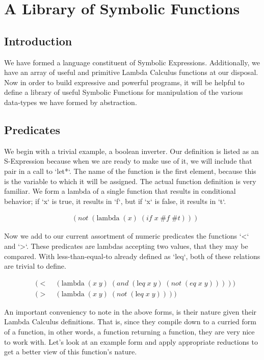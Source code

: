 
\chapter{A Library of Symbolic Functions}
\section{Introduction}
We have formed a language constituent of Symbolic Expressions. Additionally, we 
have an array of useful and primitive Lambda Calculus functions at our disposal. 
Now in order to build expressive and powerful programs, it will be helpful to 
define a library of useful Symbolic Functions for manipulation of the various 
data-types we have formed by abstraction.

\section{Predicates}
We begin with a trivial example, a boolean inverter. Our definition is listed as 
an S-Expression because when we are ready to make use of it, we will include that 
pair in a call to `let*`. The name of the function is the first element, because 
this is the variable to which it will be assigned. The actual function definition 
is very familiar. We form a lambda of a single function that results in 
conditional behavior; if `x` is true, it results in `f`, but if `x` is false, it 
results in `t`.

\begin{align*}
& (not \; (\text{lambda} \; (x) \; (if \; x \; \#f \; \#t)))
\end{align*}

Now we add to our current assortment of numeric predicates the functions `<` and 
`>`. These predicates are lambdas accepting two values, that they may be compared. 
With less-than-equal-to already defined as `leq`, both of these relations are 
trivial to define.

\begin{align*}
& (< \; &(\text{lambda} \; (x \; y) \; (and \; (\text{le}q \; x \; y) \; (not \; (eq \; x \; y)))))
\\& (> \; &(\text{lambda} \; (x \; y) \; (not \; (\text{le}q \; x \; y))))
\end{align*}

An important conveniency to note in the above forms, is their nature given their 
Lambda Calculus definitions. That is, since they compile down to a curried form of 
a function, in other words, a function returning a function, they are very nice to 
work with. Let's look at an example form and apply appropriate reductions to get a 
better view of this function's nature.


